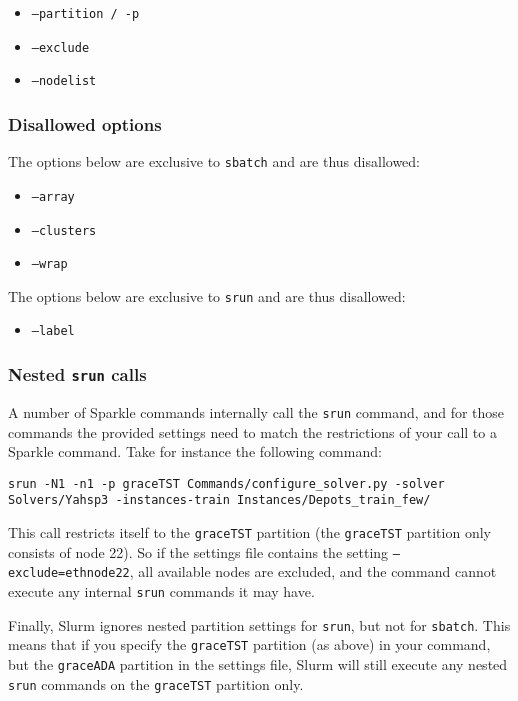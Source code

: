 \documentclass{article}
\begin{document}
\begin{itemize}
  \setlength{\itemsep}{0pt}
  \item[] \texttt{--partition / -p}
  \item[] \texttt{--exclude}
  \item[] \texttt{--nodelist}
\end{itemize}

\subsubsection{Disallowed options}
\label{slurm:disallowed}
The options below are exclusive to \texttt{sbatch} and are thus disallowed:

\begin{itemize}
  \setlength{\itemsep}{0pt}
  \item[] \texttt{--array}
  \item[] \texttt{--clusters}
  \item[] \texttt{--wrap}
\end{itemize}

The options below are exclusive to \texttt{srun} and are thus disallowed:

\begin{itemize}
  \setlength{\itemsep}{0pt}
  \item[] \texttt{--label}
\end{itemize}

\subsubsection{Nested \texttt{srun} calls}
A number of Sparkle commands internally call the \texttt{srun} command, and for those commands the provided settings need to match the restrictions of your call to a Sparkle command. Take for instance the following command:

\begin{lstlisting}[breaklines]
srun -N1 -n1 -p graceTST Commands/configure_solver.py -solver Solvers/Yahsp3 -instances-train Instances/Depots_train_few/
\end{lstlisting}

This call restricts itself to the \texttt{graceTST} partition (the \texttt{graceTST} partition only consists of node 22). So if the settings file contains the setting \texttt{--exclude=ethnode22}, all available nodes are excluded, and the command cannot execute any internal \texttt{srun} commands it may have.

Finally, Slurm ignores nested partition settings for \texttt{srun}, but not for \texttt{sbatch}. This means that if you specify the \texttt{graceTST} partition (as above) in your command, but the \texttt{graceADA} partition in the settings file, Slurm will still execute any nested \texttt{srun} commands on the \texttt{graceTST} partition only.
\end{document}
